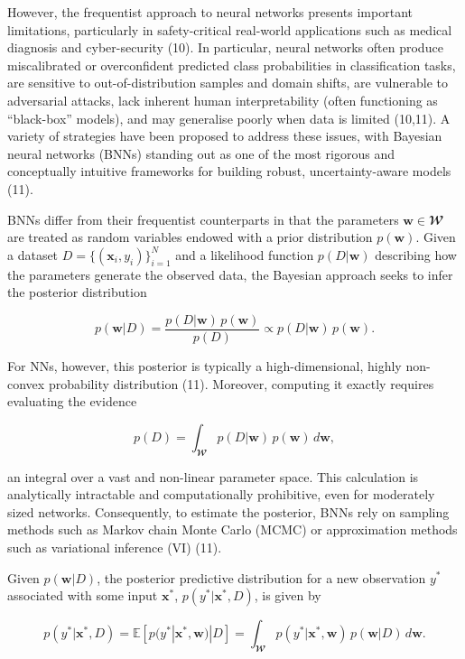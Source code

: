 \documentclass[
  a4paper,
]{scrreprt}
\begin{document}
However, the frequentist approach to neural networks presents important
limitations, particularly in safety-critical real-world applications
such as medical diagnosis and cyber-security (10). In particular, neural
networks often produce miscalibrated or overconfident predicted class
probabilities in classification tasks, are sensitive to
out-of-distribution samples and domain shifts, are vulnerable to
adversarial attacks, lack inherent human interpretability (often
functioning as ``black-box'' models), and may generalise poorly when
data is limited (10,11). A variety of strategies have been proposed to
address these issues, with Bayesian neural networks (BNNs) standing out
as one of the most rigorous and conceptually intuitive frameworks for
building robust, uncertainty-aware models (11).

BNNs differ from their frequentist counterparts in that the parameters
\(\mathbf{w} \in \mathbfcal{W}\) are treated as random variables endowed
with a prior distribution \(p(\mathbf{w})\). Given a dataset
\(D = \{(\mathbf{x}_i, y_i)\}_{i=1}^N\) and a likelihood function
\(p(D | \mathbf{w})\) describing how the parameters generate the
observed data, the Bayesian approach seeks to infer the posterior
distribution

\[
p(\mathbf{w} | D) = \frac{p(D | \mathbf{w})\, p(\mathbf{w})}{p(D)} \propto p(D | \mathbf{w})\, p(\mathbf{w}).
\]

For NNs, however, this posterior is typically a high-dimensional, highly
non-convex probability distribution (11). Moreover, computing it exactly
requires evaluating the evidence

\[
p(D) = \int_{\mathbfcal{W}} p(D | \mathbf{w})\, p(\mathbf{w}) \, d\mathbf{w},
\]

an integral over a vast and non-linear parameter space. This calculation
is analytically intractable and computationally prohibitive, even for
moderately sized networks. Consequently, to estimate the posterior, BNNs
rely on sampling methods such as Markov chain Monte Carlo (MCMC) or
approximation methods such as variational inference (VI) (11).

Given \(p(\mathbf{w} | D)\), the posterior predictive distribution for a
new observation \(y^{*}\) associated with some input \(\mathbf{x}^{*}\),
\(p(y^{*} | \mathbf{x}^{*}, D)\), is given by

\[
p(y^{*} | \mathbf{x}^{*}, D) = \mathbb{E}\!\left[p(y^{*} | \mathbf{x}^{*}, \mathbf{w}) | D\right] 
= \int_{\mathbfcal{W}} p(y^{*} | \mathbf{x}^{*}, \mathbf{w}) \, p(\mathbf{w} | D) \, d\mathbf{w}.
\]
\end{document}
